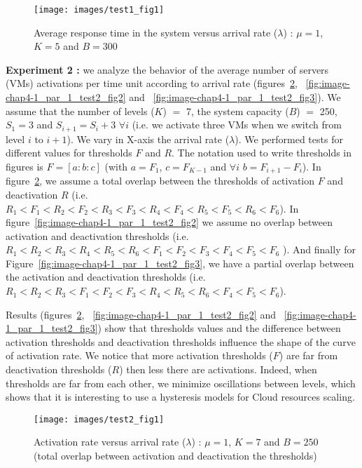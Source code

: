 \documentclass[conference]{IEEEtran}
\begin{document}
\begin{figure}[!t]
\centering
\texttt{[image: images/test1\_fig1]}
\caption{Average response time in the system versus arrival rate ($\lambda$) : $\mu=1$, $K=5$ and $B=300$}
\label{fig:image-chap4-1_par_1-test1_fig1}
\end{figure}

\textbf{Experiment 2 :} we analyze the behavior of the average number of servers (VMs) activations per time unit according to arrival rate (figures~\ref{fig:image-chap4-1_par_1_test2_fig1}, ~\ref{fig:image-chap4-1_par_1_test2_fig2} and ~\ref{fig:image-chap4-1_par_1_test2_fig3}). We assume that the number of levels ($K$) $=$ 7, the system capacity ($B$) $=$ 250, $S_{1}=3$ and $S_{i+1}=S_{i}+3$ $\forall i$ (i.e. we activate three VMs when we switch from level $i$ to $i+1$). We vary in X-axis the arrival rate ($\lambda$). We performed tests for different values for thresholds $F$ and $R$. The notation used to write thresholds in figures is $F=[a:b:c]$ (with $a=F_1$, $c=F_{K-1}$ and $\forall i$ $b=F_{i+1}-F_{i}$). In figure~\ref{fig:image-chap4-1_par_1_test2_fig1}, we assume a total overlap between the thresholds of activation $F$ and deactivation $R$ (i.e. $R_1 < F_1 < R_2 < F_2 < R_3 < F_3 < R_4 < F_4 < R_5 < F_5 < R_6 < F_6$). In figure~\ref{fig:image-chap4-1_par_1_test2_fig2} we assume no overlap between activation and deactivation thresholds (i.e. $R_1 < R_2 < R_3 < R_4 < R_5 < R_6 < F_1 < F_2 < F_3 < F_4 < F_5 < F_6$ ). And finally for Figure~\ref{fig:image-chap4-1_par_1_test2_fig3}, we have a partial overlap between the activation and deactivation thresholds (i.e. $R_1 < R_2 < R_3 < F_1 < F_2 < F_3 < R_4 < R_5 < R_6 < F_4 < F_5 < F_6$). 

Results (figures~\ref{fig:image-chap4-1_par_1_test2_fig1}, ~\ref{fig:image-chap4-1_par_1_test2_fig2} and ~\ref{fig:image-chap4-1_par_1_test2_fig3}) show that thresholds values and the difference between activation thresholds and deactivation thresholds influence the shape of the curve of activation rate. We notice that more activation thresholds ($F$) are far from deactivation thresholds ($R$) then less there are activations. Indeed, when thresholds are far from each other, we minimize oscillations between levels, which shows that it is interesting to use a hysteresis models for Cloud resources scaling.

\begin{figure}[!t]
\centering
\texttt{[image: images/test2\_fig1]}
\caption{Activation rate versus arrival rate ($\lambda$) : $\mu=1$, $K=7$ and $B=250$ (total overlap between activation and deactivation the thresholds)}
\label{fig:image-chap4-1_par_1_test2_fig1}
\end{figure}
\end{document}
